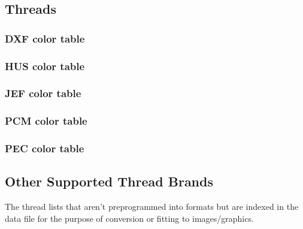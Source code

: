 \documentclass[a4paper, 11pt]{report}
\begin{document}
\subsection{Threads}

\subsubsection{DXF color table}

\subsubsection{HUS color table}

\subsubsection{JEF color table}

\subsubsection{PCM color table}

\subsubsection{PEC color table}

\subsection{Other Supported Thread Brands}

The thread lists that aren't preprogrammed into formats but
are indexed in the data file for the purpose of conversion
or fitting to images/graphics.
\end{document}

